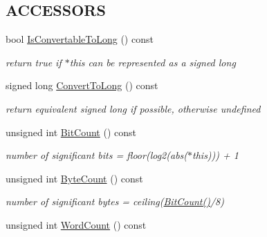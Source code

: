 \subsection*{ACCESSORS}
\label{_amgrpc0453e8d6311263eccfc02576bf64333}
 \begin{DoxyCompactItemize}
\item 
\hypertarget{class_integer_abc8abb12371da5c520d15efd64532697}{
bool \hyperlink{class_integer_abc8abb12371da5c520d15efd64532697}{IsConvertableToLong} () const }
\label{class_integer_abc8abb12371da5c520d15efd64532697}

\begin{DoxyCompactList}\small\item\em return true if $\ast$this can be represented as a signed long \item\end{DoxyCompactList}\item 
\hypertarget{class_integer_a9c689da5ded6e077a203b122deec519f}{
signed long \hyperlink{class_integer_a9c689da5ded6e077a203b122deec519f}{ConvertToLong} () const }
\label{class_integer_a9c689da5ded6e077a203b122deec519f}

\begin{DoxyCompactList}\small\item\em return equivalent signed long if possible, otherwise undefined \item\end{DoxyCompactList}\item 
\hypertarget{class_integer_a178398002ab175e788a3bc224e5e5a8d}{
unsigned int \hyperlink{class_integer_a178398002ab175e788a3bc224e5e5a8d}{BitCount} () const }
\label{class_integer_a178398002ab175e788a3bc224e5e5a8d}

\begin{DoxyCompactList}\small\item\em number of significant bits = floor(log2(abs($\ast$this))) + 1 \item\end{DoxyCompactList}\item 
\hypertarget{class_integer_aea4f2d31725ab02c67d9ea0288767670}{
unsigned int \hyperlink{class_integer_aea4f2d31725ab02c67d9ea0288767670}{ByteCount} () const }
\label{class_integer_aea4f2d31725ab02c67d9ea0288767670}

\begin{DoxyCompactList}\small\item\em number of significant bytes = ceiling(\hyperlink{class_integer_a178398002ab175e788a3bc224e5e5a8d}{BitCount()}/8) \item\end{DoxyCompactList}\item 
\hypertarget{class_integer_aa8ecc9cc334b338ee805f91e6b289396}{
unsigned int \hyperlink{class_integer_aa8ecc9cc334b338ee805f91e6b289396}{WordCount} () const }
\label{class_integer_aa8ecc9cc334b338ee805f91e6b289396}


\end{DoxyCompactItemize}
